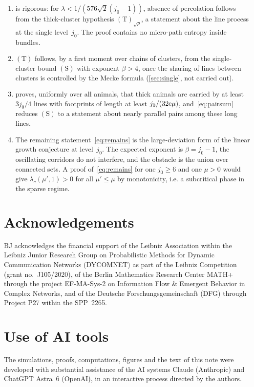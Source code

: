 \documentclass[11pt,letterpaper]{article}
\begin{document}
\begin{enumerate}
  \item {} is rigorous: for $\lambda<1/(576\sqrt2(j_0-1))$, absence of percolation follows from the thick-cluster hypothesis $\mathrm{(T)}_{\sqrt\rho}$, a statement about the line process at the single level~$j_0$. The proof contains no micro-path entropy inside bundles.
  \item $\mathrm{(T)}$ follows, by a first moment over chains of clusters, from the single-cluster bound $\mathrm{(S)}$ with exponent $\beta>4$, once the sharing of lines between clusters is controlled by the Mecke formula (\cref{sec:single}, not carried out).
  \item {} proves, uniformly over all animals, that thick animals are carried by at least $3j_0/4$ lines with footprints of length at least $j_0/(32\mathrm{e}\mu)$, and~\eqref{eq:pairsum} reduces $\mathrm{(S)}$ to a statement about nearly parallel pairs among these long lines.
  \item The remaining statement~\eqref{eq:remains} is the large-deviation form of the linear growth conjecture at level~$j_0$. The expected exponent is $\beta=j_0-1$, the oscillating corridors do not interfere, and the obstacle is the union over connected sets. A proof of~\eqref{eq:remains} for one $j_0\ge6$ and one $\mu>0$ would give $\lambda_c(\mu',1)>0$ for all $\mu'\le\mu$ by monotonicity, i.e. a subcritical phase in the sparse regime.
\end{enumerate}

\section*{Acknowledgements}

BJ acknowledges the financial support of the Leibniz Association within the Leibniz Junior Research Group on Probabilistic Methods for Dynamic Communication Networks (DYCOMNET) as part of the Leibniz Competition (grant no.~J105/2020), of the Berlin Mathematics Research Center MATH+ through the project EF-MA-Sys-2 on Information Flow \& Emergent Behavior in Complex Networks, and of the Deutsche Forschungsgemeinschaft (DFG) through Project P27 within the SPP~2265.

\section*{Use of AI tools}

The simulations, proofs, computations, figures and the text of this note were developed with substantial assistance of the AI systems Claude (Anthropic) and ChatGPT Astra~6 (OpenAI), in an interactive process directed by the authors.



\end{document}
